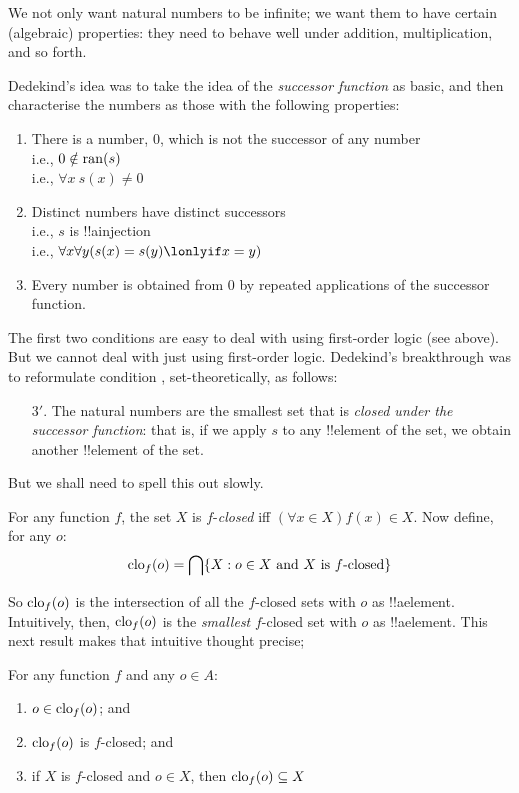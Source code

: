 \documentclass[../../../include/open-logic-section]{subfiles}
\begin{document}

We not only want natural numbers to be infinite; we want them to have
certain (algebraic) properties: they need to behave well under
addition, multiplication, and so forth. 

Dedekind's idea was to take the idea of the \emph{successor function}
as basic, and then characterise the numbers as those with the
following properties:
\begin{enumerate}
	\item There is a number, $0$, which is not the successor of any number
	\\i.e., $0 \notin \mathrm{ran}(s)$
	\\i.e., $\forall x\ s(x) \neq 0$
	\item Distinct numbers have distinct successors 
	\\i.e., $s$ is !!a{injection}
	\\i.e., $\forall x \forall y (s(x) = s(y) \lonlyif x = y)$
	\item{} Every number is obtained from
	$0$ by repeated applications of the successor function.
\end{enumerate}
The first two conditions are easy to deal with using first-order logic
(see above). But we cannot deal with  just
using first-order logic. Dedekind's breakthrough was to reformulate
condition , set-theoretically, as follows:
\begin{enumerate}
	\item[3$'$.] The natural numbers are the smallest set that is
	\emph{closed under the successor function}: that is, if we apply
	$s$ to any !!{element} of the set, we obtain another !!{element}
	of the set.
\end{enumerate}
But we shall need to spell this out slowly.

\begin{defn}
	For any function $f$, the set $X$ is $f$-\emph{closed} {iff}
	$(\forall x \in X)f(x) \in X$. Now define, for any $o$:
	$$\mathrm{clo}_{f}(o) = \bigcap\{ X : o \in X\text{ and }X
\text{ is $f$-closed} \}$$
\end{defn}

So $\mathrm{clo}_{f}(o)$ is the intersection of all the $f$-closed
sets with $o$ as !!a{element}. Intuitively, then,
$\mathrm{clo}_{f}(o)$ is the \emph{smallest} $f$-closed set with $o$
as !!a{element}. This next result makes that intuitive thought
precise;
\begin{lem}
	For any function $f$ and any $o \in A$:
	\begin{enumerate}
		\item{} $o \in \mathrm{clo}_{f}(o)$; and
		\item{} $\mathrm{clo}_{f}(o)$ is $f$-closed; and
		\item{} if $X$ is $f$-closed and $o \in
		X$, then $\mathrm{clo}_{f}(o) \subseteq X$
	\end{enumerate}
\end{lem}
\end{document}
